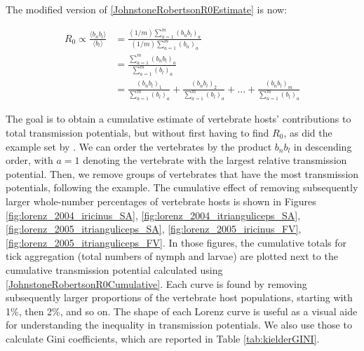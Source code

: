 \documentclass[hidelinks]{article}
\begin{document}
The modified version of \eqref{JohnstoneRobertsonR0Estimate} is now:
 
\begin{align} 
	R_0 \propto \frac{\langle b_n b_l \rangle}{\langle b_l \rangle} &= \frac{(1/m)\sum_{a=1}^m (b_n b_l)_a}{(1/m)\sum_{a=1}^m (b_n)_a} \nonumber \\ 
																	&= \frac{\sum_{a=1}^m (b_n b_l )_a}{\sum_{a=1}^m (b_l)_a} \nonumber \\ 
																	&= \frac{(b_n b_l)_1}{\sum_{a=1}^m (b_l)_a} + \frac{(b_n b_l)_2}{\sum_{a=1}^m (b_l)_a} + ... + \frac{(b_n b_l)_m}{\sum_{a=1}^m (b_l)_a} \label{JohnstoneRobertsonR0Cumulative}
\end{align}

The goal is to obtain a cumulative estimate of vertebrate hosts' contributions to total transmission potentials, but without first having to find $ R_0 $, as did the example set by \citet{Perkins_2003}. We can order the vertebrates by the product $ b_n b_l $ in descending order, with $ a=1 $ denoting the vertebrate with the largest relative transmission potential. Then, we remove groups of vertebrates that have the most transmission potentials, following the \citet{Perkins_2003} example. The cumulative effect of removing subsequently larger whole-number percentages of vertebrate hosts is shown in Figures \ref{fig:lorenz_2004_iricinus_SA}, \ref{fig:lorenz_2004_itrianguliceps_SA}, \ref{fig:lorenz_2005_itrianguliceps_SA}, \ref{fig:lorenz_2005_iricinus_FV}, \ref{fig:lorenz_2005_itrianguliceps_FV}. In those figures, the cumulative totals for tick aggregation (total numbers of nymph and larvae) are plotted next to the cumulative transmission potential calculated using \eqref{JohnstoneRobertsonR0Cumulative}. Each curve is found by removing subsequently larger proportions of the vertebrate host populations, starting with 1\%, then 2\%, and so on. The shape of each Lorenz curve is useful as a visual aide for understanding the inequality in transmission potentials. We also use those to calculate Gini coefficients, which are reported in Table \ref{tab:kielderGINI}.
\end{document}
